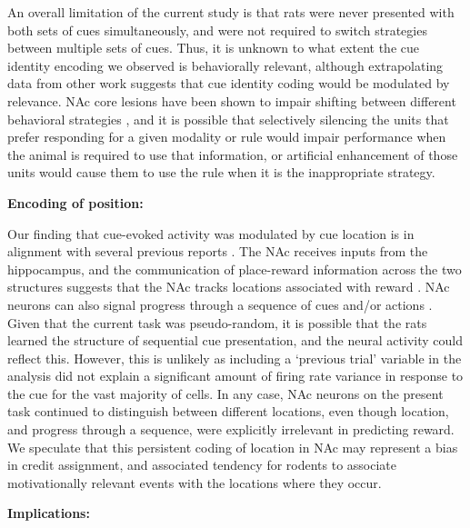 \documentclass[11pt]{article}
\let\cite=\citep
\begin{document}
{An overall limitation of the current study is that rats were never
presented with both sets of cues simultaneously, and were not required
to switch strategies between multiple sets of cues. Thus, it is
unknown to what extent the cue identity encoding we observed is
behaviorally relevant, although extrapolating data from other work
\cite{Sleezer2016} suggests that cue identity coding would be
modulated by relevance. NAc core lesions have been shown to impair
shifting between different behavioral strategies \cite{Floresco2006a},
and it is possible that selectively silencing the units that prefer
responding for a given modality or rule would impair performance when
the animal is required to use that information, or artificial
enhancement of those units would cause them to use the rule when it is
the inappropriate strategy.

{\bf Encoding of position:}

Our finding that cue-evoked activity was modulated by cue location is
in alignment with several previous reports
\cite{Lavoie1994,Mulder2005,Strait2016,Wiener2003}. The NAc receives
inputs from the hippocampus, and the communication of place-reward
information across the two structures suggests that the NAc tracks
locations associated with reward
\cite{Lansink2008,Lansink2009,Lansink2016,Pennartz2004,Sjulson2017,Tabuchi2000,VanderMeer2011}. NAc
neurons can also signal progress through a sequence of cues and/or
actions
\cite{Shidara1998,Atallah2014,Berke2009,Khamassi2008,Lansink2012,Mulder2004}. Given
that the current task was pseudo-random, it is possible that the rats
learned the structure of sequential cue presentation, and the neural
activity could reflect this. However, this is unlikely as including a
‘previous trial’ variable in the analysis did not explain a
significant amount of firing rate variance in response to the cue for
the vast majority of cells. In any case, NAc neurons on the present
task continued to distinguish between different locations, even though
location, and progress through a sequence, were explicitly irrelevant
in predicting reward. We speculate that this persistent coding of
location in NAc may represent a bias in credit assignment, and
associated tendency for rodents to associate motivationally relevant
events with the locations where they occur.

{\bf Implications:}

}
\end{document}
